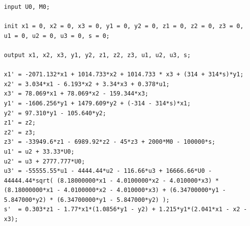 	\begin{listing}
		\label{listing1}
		\begin{verbatim}
input U0, M0;

init x1 = 0, x2 = 0, x3 = 0, y1 = 0, y2 = 0, z1 = 0, z2 = 0, z3 = 0, u1 = 0, u2 = 0, u3 = 0, s = 0;

output x1, x2, x3, y1, y2, z1, z2, z3, u1, u2, u3, s;

x1' = -2071.132*x1 + 1014.733*x2 + 1014.733 * x3 + (314 + 314*s)*y1;
x2' = 3.034*x1 - 6.193*x2 + 3.34*x3 + 0.378*u1;
x3' = 78.069*x1 + 78.069*x2 - 159.344*x3;
y1' = -1606.256*y1 + 1479.609*y2 + (-314 - 314*s)*x1;
y2' = 97.310*y1 - 105.640*y2;
z1' = z2;
z2' = z3;
z3' = -33949.6*z1 - 6989.92*z2 - 45*z3 + 2000*M0 - 100000*s;
u1' = u2 + 33.33*U0;
u2' = u3 + 2777.777*U0;
u3' = -55555.55*u1 - 4444.44*u2 - 116.66*u3 + 16666.66*U0 - 44444.44*sqrt( (8.18000000*x1 - 4.0100000*x2 - 4.010000*x3) * (8.18000000*x1 - 4.0100000*x2 - 4.010000*x3) + (6.34700000*y1 - 5.847000*y2) * (6.34700000*y1 - 5.847000*y2) );
s'  = 0.303*z1 - 1.77*x1*(1.0856*y1 - y2) + 1.215*y1*(2.041*x1 - x2 - x3);
		\end{verbatim}
	\end{listing}
		
